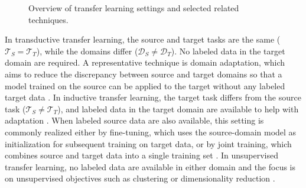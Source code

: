 \begin{figure}[H]
{%
}
\caption{Overview of transfer learning settings and selected related techniques.}
\label{fig:tl_settings}
\end{figure}

In transductive transfer learning, the source and target tasks are the same ($\mathcal{T}_S = \mathcal{T}_T$), while the domains differ ($\mathcal{D}_S \neq \mathcal{D}_T$). No labeled data in the target domain are required. A representative technique is domain adaptation, which aims to reduce the discrepancy between source and target domains so that a model trained on the source can be applied to the target without any labeled target data \cite{farahani2020}. In inductive transfer learning, the target task differs from the source task ($\mathcal{T}_S \neq \mathcal{T}_T$), and labeled data in the target domain are available to help with adaptation \cite{pan2010}. When labeled source data are also available, this setting is commonly realized either by fine-tuning, which uses the source-domain model as initialization for subsequent training on target data, or by joint training, which combines source and target data into a single training set \cite{garcia2020}. In unsupervised transfer learning, no labeled data are available in either domain and the focus is on unsupervised objectives such as clustering or dimensionality reduction \cite{pan2010}.




